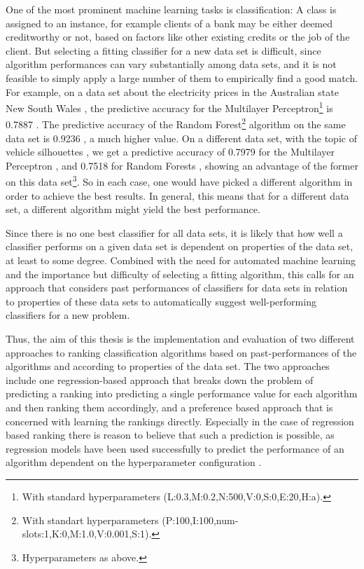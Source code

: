 One of the most prominent machine learning tasks is classification: A class is assigned to an instance, for example clients of a bank may be either deemed creditworthy or not, based on factors like other existing credits or the job of the client. But selecting a fitting classifier for a new data set is difficult, since algorithm performances can vary substantially among data sets, and it is not feasible to simply apply a large number of them to empirically find a good match. For example, on a data set about the electricity prices in the Australian state New South Wales \cite{harris1999splice}, the predictive accuracy for the Multilayer Perceptron\footnote{With standard hyperparameters (L:0.3,M:0.2,N:500,V:0,S:0,E:20,H:a).} is 0.7887 \cite{cachada2017run3}. The predictive accuracy of the Random Forest\footnote{With standart hyperparameters (P:100,I:100,num-slots:1,K:0,M:1.0,V:0.001,S:1).} algorithm on the same data set is 0.9236 \cite{cachada2017run}, a much higher value. On a different data set, with the topic of vehicle silhouettes \cite{siebert1987vehicle}, we get a predictive accuracy of 0.7979 for the Multilayer Perceptron \cite{cachada2017run4}, and 0.7518 for Random Forests \cite{cachada2017run2}, showing an advantage of the former on this data set\footnote{Hyperparameters as above.}. So in each case, one would have picked a different algorithm in order to achieve the best results. In general, this means that for a different data set, a different algorithm might yield the best performance.

Since there is no one best classifier for all data sets, it is likely that how well a classifier performs on a given data set is dependent on properties of the data set, at least to some degree. Combined with the need for automated machine learning and the importance but difficulty of selecting a fitting algorithm, this calls for an approach that considers past performances of classifiers for data sets in relation to properties of these data sets to automatically suggest well-performing classifiers for a new problem.

Thus, the aim of this thesis is the implementation and evaluation of two different approaches to ranking classification algorithms based on past-performances of the algorithms and according to properties of the data set. The two approaches include one regression-based approach that breaks down the problem of predicting a ranking into predicting a single performance value for each algorithm and then ranking them accordingly, and a preference based approach that is concerned with learning the rankings directly. Especially in the case of regression based ranking there is reason to believe that such a prediction is possible, as regression models have been used successfully to predict the performance of an algorithm dependent on the hyperparameter configuration \cite{DBLP:conf/aaai/EggenspergerHHL15}.


